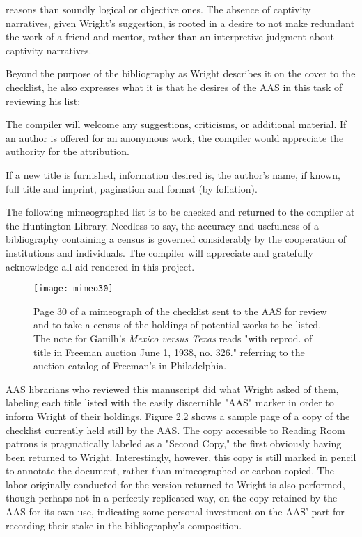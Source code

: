 reasons than soundly logical or objective ones. The absence of captivity narratives, given Wright's suggestion, is rooted in a desire to not make redundant the work of a friend and mentor, rather than an interpretive judgment about captivity narratives. 

Beyond the purpose of the bibliography as Wright describes it on the cover to the checklist, he also expresses what it is that he desires of the AAS in this task of reviewing his list:
\begin{displayquote}
The compiler will welcome any suggestions, criticisms, or additional material. If an author is offered for an anonymous work, the compiler would appreciate the authority for the attribution. 

If a new title is furnished, information desired is, the author's name, if known, full title and imprint, pagination and format (by foliation).

The following mimeographed list is to be checked and returned to the compiler at the Huntington Library. Needless to say, the accuracy and usefulness of a bibliography containing a census is governed considerably by the cooperation of institutions and individuals. The compiler will appreciate and gratefully acknowledge all aid rendered in this project.
\end{displayquote}
\begin{figure}
\texttt{[image: mimeo30]}
\caption{Page 30 of a mimeograph of the checklist sent to the AAS for review and to take a census of the holdings of potential works to be listed. The note for Ganilh's \textit{Mexico versus Texas} reads "with reprod. of title in Freeman auction June 1, 1938, no. 326." referring to the auction catalog of Freeman's in Philadelphia.}
\end{figure}
AAS librarians who reviewed this manuscript did what Wright asked of them, labeling each title listed with the easily discernible "AAS" marker in order to inform Wright of their holdings. Figure 2.2 shows a sample page of a copy of the checklist currently held still by the AAS. The copy accessible to Reading Room patrons is pragmatically labeled as a "Second Copy," the first obviously having been returned to Wright. Interestingly, however, this copy is still marked in pencil to annotate the document, rather than mimeographed or carbon copied. The labor originally conducted for the version returned to Wright is also performed, though perhaps not in a perfectly replicated way, on the copy retained by the AAS for its own use, indicating some personal investment on the AAS' part for recording their stake in the bibliography's composition.

